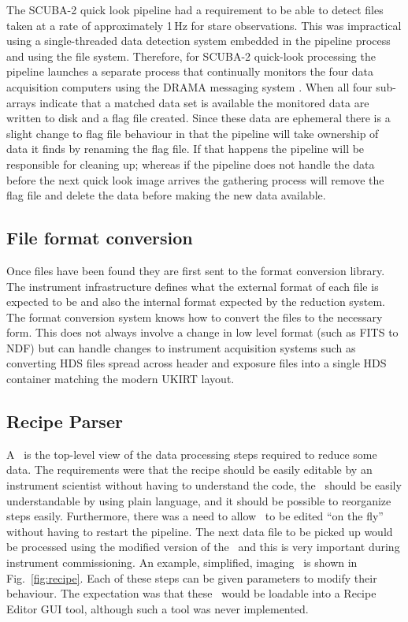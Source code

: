 \documentclass[final,authoryear,5p,times,twocolumn]{elsarticle}
\begin{document}
The SCUBA-2 quick look pipeline \citep{2005ASPC..347..585G} had a
requirement to be able to detect files taken at a rate of
approximately 1\,Hz for stare observations. This was impractical using
a single-threaded data detection system embedded in the pipeline process and
using the file system. Therefore, for SCUBA-2 quick-look processing the
pipeline launches a separate process that continually monitors the
four data acquisition computers using the DRAMA messaging system
\citep{1995SPIE.2479...62B}. When all four sub-arrays indicate that a
matched data set is available the monitored data are written to disk
and a flag file created. Since these data are ephemeral there is a
slight change to flag file behaviour in that the pipeline will take
ownership of data it finds by renaming the flag file. If that happens
the pipeline will be responsible for cleaning up; whereas if the
pipeline does not handle the data before the next quick look image
arrives the gathering process will remove the flag file and delete the
data before making the new data available.

\subsection{File format conversion}

Once files have been found they are first sent to the format
conversion library. The instrument infrastructure defines what the
external format of each file is expected to be and also the internal format
expected by the reduction system. The format conversion system knows
how to convert the files to the necessary form. This does not always
involve a change in low level format (such as FITS to NDF) but can
handle changes to instrument acquisition systems such as converting
HDS files spread across header and exposure files into a single HDS
container matching the modern UKIRT layout.

\subsection{Recipe Parser}

A \recipe\ is the top-level view of the data processing steps
required to reduce some data. The requirements were that the recipe
should be easily editable by an instrument scientist without having to
understand the code, the \recipe\ should be easily understandable by
using plain language, and it should be possible to reorganize steps
easily. Furthermore, there was a need to allow \recipes\ to be edited
``on the fly'' without having to restart the pipeline. The next data file
to be picked up would be processed using the modified version of the
\recipe\ and this is very important during instrument commissioning. An
example, simplified, imaging \recipe\ is shown in Fig.\
\ref{fig:recipe}. Each of these steps can be given parameters to
modify their behaviour. The expectation was that these \recipes\ would
be loadable into a Recipe Editor GUI tool, although such a tool was
never implemented.
\end{document}

